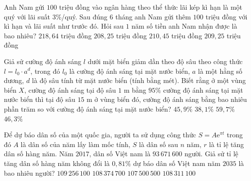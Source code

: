 \begin{ex}%
	Anh Nam gửi $100$ triệu đồng vào ngân hàng theo thể thức lãi kép kì hạn là một quý với lãi suất $3\%$/quý. Sau đúng $6$ tháng anh Nam gửi thêm $100$ triệu đồng với kì hạn và lãi suất như  trước đó. Hỏi sau $1$ năm số tiền anh Nam nhận được là bao nhiêu?
	\choice 
		 {\True $218{,}64$ triệu đồng}
		{ $208{,}25$ triệu  đồng}
		{$210{,}45$ triệu  đồng}
		{$209{,}25$ triệu  đồng}
\end{ex}

\begin{ex}%
	Giả sử cường độ ánh sáng $l$ dưới mặt biển giảm dần theo độ sâu theo công thức $l=l_0\cdot a^d$, trong đó $l_0$ là cường độ ánh sáng tại mặt nước biển, $a$ là một hằng số dương, $d$ là độ sâu tính từ mặt nước biển (tính bằng mét). Biết rằng ở một vùng biển $X$, cường độ ánh sáng tại độ sâu $1$ m bằng $95\%$ cường độ ánh sáng tại mặt nước biển thì tại độ sâu $15$ m ở vùng biển đó,  cường độ ánh sáng bằng bao nhiêu phần trăm so với cường độ ánh sáng tại mặt nước biển?
	 \choice
		 {$45{,}9\%$}
		{$38{,}1\%$} 
		{$59{,}7\%$} 
		{\True  $46{,}3\%$}
\end{ex}

\begin{ex}%
	Để dự báo dân số của một quốc gia, người ta sử dụng công thức $S=A\mathrm{e}^{\pi t}$ trong đó $A$ là dân số của năm lấy làm mốc tính,  $S$ là dân số sau $n$ năm, $r$ là tỉ lệ tăng dân số hàng năm. Năm $2017$, dân số Việt nam là $93\,671\,600$ người. Giả sử tỉ lệ tăng dân số hàng năm không đổi là $0{,}81\%$ dự báo dân số Việt nam năm $2035$ là bao nhiêu người?
	\choice 
		 {$109\,256\,100$}
		 {\True $108\,374\,700$}
		 {$107\,500\,500$}
		 {$108\,311\,100$}
\end{ex}

